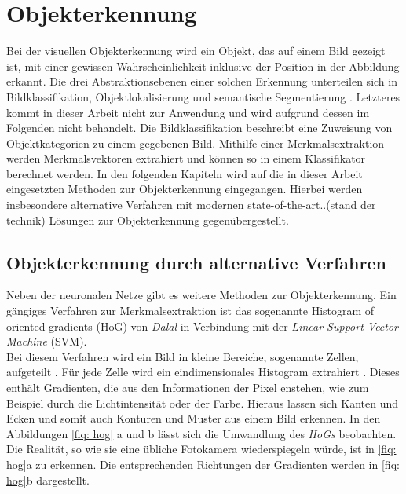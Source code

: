 		
	\section{Objekterkennung}
	\label{sec: Objekterkennung}
	Bei der visuellen Objekterkennung wird ein Objekt, das auf einem Bild gezeigt ist, mit einer gewissen Wahrscheinlichkeit inklusive der Position in der Abbildung erkannt. Die drei Abstraktionsebenen einer solchen Erkennung unterteilen sich in Bildklassifikation, Objektlokalisierung und semantische Segmentierung \cite{bildundobjekt}. Letzteres kommt in dieser Arbeit nicht zur Anwendung und wird aufgrund dessen im Folgenden nicht behandelt. Die Bildklassifikation beschreibt eine Zuweisung von Objektkategorien zu einem gegebenen Bild. Mithilfe einer Merkmalsextraktion werden Merkmalsvektoren extrahiert und können so in einem Klassifikator berechnet werden. In den folgenden Kapiteln wird auf die in dieser Arbeit eingesetzten Methoden zur Objekterkennung eingegangen. Hierbei werden insbesondere alternative Verfahren mit modernen state-of-the-art..(stand der technik) Lösungen zur Objekterkennung gegenübergestellt.  
	
	
		\subsection{Objekterkennung durch alternative Verfahren}
		\label{subsec: Objekterkennung durch alternative Verfahren}	
		
		
		Neben der neuronalen Netze gibt es weitere Methoden zur Objekterkennung. Ein gängiges Verfahren zur Merkmalsextraktion ist das sogenannte Histogram of oriented gradients (HoG) von \textit{Dalal} in Verbindung mit der \textit{Linear Support Vector Machine} (SVM).\\
		
		Bei diesem Verfahren wird ein Bild in kleine Bereiche, sogenannte Zellen, aufgeteilt \cite{hogsvm}. Für jede Zelle wird ein eindimensionales Histogram extrahiert \cite{hogsvm}. Dieses enthält Gradienten, die aus den Informationen der Pixel enstehen, wie zum Beispiel durch die Lichtintensität oder der Farbe. Hieraus lassen sich Kanten und Ecken und somit auch Konturen und Muster aus einem Bild erkennen. In den Abbildungen \ref{fiq: hog} a und b lässt sich die Umwandlung des \textit{HoGs} beobachten. Die Realität, so wie sie eine übliche Fotokamera wiederspiegeln würde, ist in \ref{fiq: hog}a zu erkennen. Die entsprechenden Richtungen der Gradienten werden in \ref{fiq: hog}b dargestellt. \\
		
